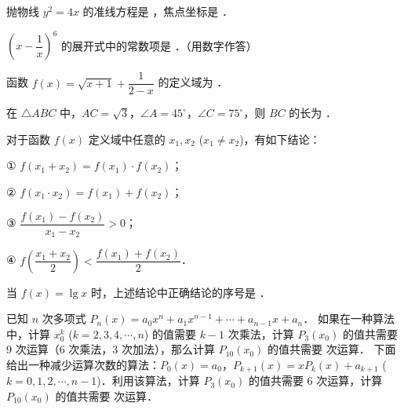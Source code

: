 \begin{question}
抛物线 $y^2 = 4x$ 的准线方程是 \gkblank{}，焦点坐标是 \gkblank{}．

\end{question}
\begin{question}
$\left(x - \dfrac{1}{x}\right)^6$ 的展开式中的常数项是 \gkblank{}．（用数字作答）

\end{question}
\begin{question}
函数 $f(x) = \sqrt{x + 1} + \dfrac{1}{2 - x}$ 的定义域为 \gkblank{}．

\end{question}
\begin{question}
在 $\triangle ABC$ 中，$AC = \sqrt{3}$，$\angle A = 45^\circ$，$\angle C = 75^\circ$，则 $BC$ 的长为 \gkblank{}．

\end{question}
\begin{question}
对于函数 $f(x)$ 定义域中任意的 $x_1, x_2$ ($x_1 \neq x_2$)，有如下结论：

① $f(x_1 + x_2) = f(x_1) \cdot f(x_2)$；

② $f(x_1 \cdot x_2) = f(x_1) + f(x_2)$；

③ $\dfrac{f(x_1) - f(x_2)}{x_1 - x_2} > 0$；

④ $f\left(\dfrac{x_1 + x_2}{2}\right) < \dfrac{f(x_1) + f(x_2)}{2}$．

当 $f(x) = \lg x$ 时，上述结论中正确结论的序号是 \gkblank{}．

\end{question}
\begin{question}
已知 $n$ 次多项式 $P_n(x) = a_0 x^n + a_1 x^{n-1} + \cdots + a_{n-1} x + a_n$．
如果在一种算法中，计算 $x_0^k$ ($k = 2, 3, 4, \cdots, n$) 的值需要 $k - 1$ 次乘法，计算 $P_3(x_0)$ 的值共需要 9 次运算（6 次乘法，3 次加法），那么计算 $P_{10}(x_0)$ 的值共需要 \gkblank{} 次运算．
下面给出一种减少运算次数的算法：$P_0(x) = a_0$，$P_{k+1}(x) = xP_k(x) + a_{k+1}$ ($k = 0, 1, 2, \cdots, n - 1$)．利用该算法，计算 $P_3(x_0)$ 的值共需要 6 次运算，计算 $P_{10}(x_0)$ 的值共需要 \gkblank{} 次运算．

\end{question}

